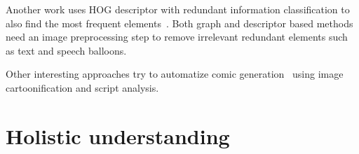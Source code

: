 Another work uses HOG descriptor with redundant information classification to also find the most frequent elements~\cite{SunICDAR2013}.
Both graph and descriptor based methods need an image preprocessing step to remove irrelevant redundant elements such as text and speech balloons.

Other interesting approaches try to automatize comic generation~\cite{Tobita2010Comic,WangHYYC12} using image cartoonification and script analysis.





\section{Holistic understanding} %
\label{sec:sota:holistic_understanding}

